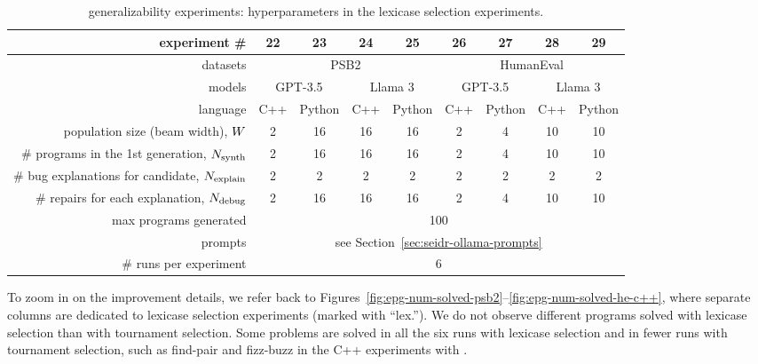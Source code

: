 \begin{table}[t]
\vspace{-2.6ex}
\setlength{\tabcolsep}{4pt}
\centering
\caption{\method{} generalizability experiments: hyperparameters in the lexicase selection experiments.}\small
\label{tab:lexicase-selection-hyperparameters}
\begin{tabular}{rcccc|cccc}
\toprule
experiment \# & 22 & 23 & 24 & 25 & 26 & 27 & 28 & 29 \\
\midrule
datasets  & \multicolumn{4}{c|}{PSB2} & \multicolumn{4}{c}{HumanEval}  \\ 
\midrule
models  & 
\multicolumn{2}{c|}{GPT-3.5} &
\multicolumn{2}{c|}{Llama 3} &
\multicolumn{2}{c|}{GPT-3.5} &
\multicolumn{2}{c}{Llama 3}\\ 
\midrule
language  & C++ & Python & C++ & \multicolumn{1}{c|}{Python} & C++ & Python & C++ & Python \\
\midrule
population size (beam width), $W{}$ & 2 & 16 & 16 & 16 & 2 & 4 & 10 & 10  \\
\# programs in the 1st generation, $N_\text{synth}{}$ & 2 & 16 & 16 & 16 & 2 & 4 & 10 & 10  \\
\# bug explanations for candidate, $N_\text{explain}{}$ & 2 & 2 & 2 & 2 & 2 & 2 & 2 & 2 \\
\# repairs for each explanation, $N_\text{debug}{}$ & 2 & 16 & 16 & 16 & 2 & 4 & 10 & 10 \\
\midrule
max programs generated & \multicolumn{8}{c}{100} \\
prompts & \multicolumn{8}{c}{see Section~\ref{sec:seidr-ollama-prompts}} \\
\# runs per experiment &  \multicolumn{8}{c}{6} \\
\bottomrule
\end{tabular}
\end{table}



To zoom in on the improvement details, we refer back to Figures~\ref{fig:epg-num-solved-psb2}--\ref{fig:epg-num-solved-he-c++}, where separate columns are dedicated to lexicase selection experiments (marked with ``lex.'').
We do not observe different programs solved with lexicase selection than with tournament selection. 
Some problems are solved in all the six runs with lexicase selection and in fewer runs with tournament selection, such as find-pair and fizz-buzz in the C++ experiments with \gpt{}.

